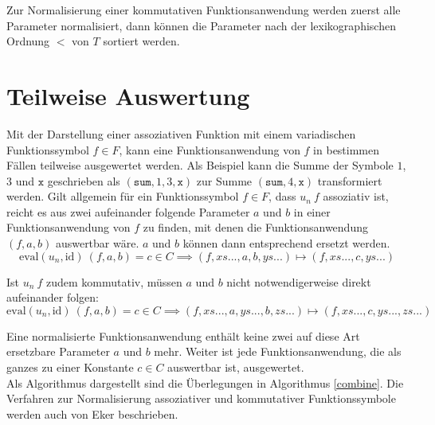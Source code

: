 Zur Normalisierung einer kommutativen Funktionsanwendung werden zuerst alle Parameter normalisiert, dann können die Parameter nach der lexikographischen Ordnung $<$ von $T$ sortiert werden. 

\section{Teilweise Auswertung} \label{subsecNormalKombinieren}

\begin{algorithm}
\DontPrintSemicolon
\caption{$\mathrm{combine} \colon T \rightarrow T$}\label{combine}

\end{algorithm}

Mit der Darstellung einer assoziativen Funktion mit einem variadischen Funktionssymbol $f \in F$, kann eine Funktionsanwendung von $f$ in bestimmen Fällen teilweise ausgewertet werden. Als Beispiel kann die Summe der Symbole $1$, $3$ und $\texttt{x}$ geschrieben als $(\texttt{sum}, 1, 3, \texttt{x})$ zur Summe $(\texttt{sum}, 4, \texttt{x})$ transformiert werden. 
Gilt allgemein für ein Funktionssymbol $f \in F$, dass $u_n~f$ assoziativ ist, reicht es aus zwei aufeinander folgende Parameter $a$ und $b$ in einer Funktionsanwendung von $f$ zu finden, mit denen die Funktionsanwendung $(f, a, b)$ auswertbar wäre. $a$ und $b$ können dann entsprechend ersetzt werden.
$$\mathrm{eval}(u_n, \mathrm{id})~(f, a, b) = c \in C \implies (f, xs..., a, b, ys...) \mapsto (f, xs..., c, ys...)$$

Ist $u_n~f$ zudem kommutativ, müssen $a$ und $b$ nicht notwendigerweise direkt aufeinander folgen:
$$\mathrm{eval}(u_n, \mathrm{id})~(f, a, b) = c \in C \implies (f, xs..., a, ys..., b, zs...) \mapsto (f, xs..., c, ys..., zs...)$$

Eine normalisierte Funktionsanwendung enthält keine zwei auf diese Art ersetzbare Parameter $a$ und $b$ mehr. Weiter ist jede Funktionsanwendung, die als ganzes zu einer Konstante $c \in C$ auswertbar ist, ausgewertet.\\
Als Algorithmus dargestellt sind die Überlegungen in Algorithmus \ref{combine}. Die Verfahren zur Normalisierung assoziativer und kommutativer Funktionssymbole werden auch von Eker \cite{BipartiteGraphMatching} beschrieben.

